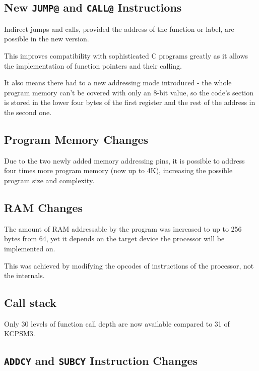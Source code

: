         \subsection{New \texttt{JUMP@} and \texttt{CALL@} Instructions}

        Indirect jumps and calls, provided the address of the function or label, are possible in the new version.

        This improves compatibility with sophisticated C programs greatly as it allows the implementation of function pointers and their calling.

        It also means there had to a new addressing mode introduced - the whole program memory can't be covered with only an 8-bit value, so the code's section is stored in the lower four bytes of the first register and the rest of the address in the second one.

        \subsection{Program Memory Changes}

        Due to the two newly added memory addressing pins, it is possible to address four times more program memory (now up to 4K), increasing the possible program size and complexity.

        \subsection{RAM Changes}

        The amount of RAM addressable by the program was increased to up to 256 bytes from 64, yet it depends on the target device the processor will be implemented on. 

        This was achieved by modifying the opcodes of instructions of the processor, not the internals.

        \subsection{Call stack}

        Only 30 levels of function call depth are now available compared to 31 of KCPSM3.

        \subsection{\texttt{ADDCY} and \texttt{SUBCY} Instruction Changes}

